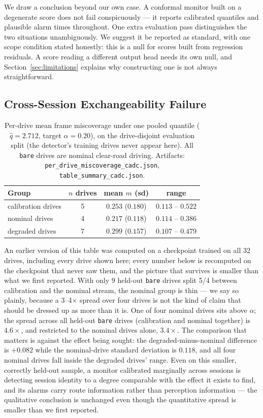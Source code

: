 We draw a conclusion beyond our own case. A conformal monitor built on a
degenerate score does not fail conspicuously --- it reports calibrated
quantiles and plausible alarm times throughout. One extra evaluation pass
distinguishes the two situations unambiguously. We suggest it be reported
as standard, with one scope condition stated honestly: this is a null for
scores built from regression residuals. A score reading a different output
head needs its own null, and Section~\ref{sec:limitations} explains why
constructing one is not always straightforward.

\subsection{Cross-Session Exchangeability Failure}
\label{sec:exchangeability}

\begin{table}[t]
\centering
\caption{Per-drive mean frame miscoverage under one pooled quantile
($\hat q = 2.712$, target $\alpha = 0.20$), on the drive-disjoint evaluation
split (the detector's training drives never appear here). All
\texttt{bare} drives are nominal clear-road driving. Artifacts:
\texttt{per\_drive\_miscoverage\_cadc.json},
\texttt{table\_summary\_cadc.json}.}
\label{tab:per-drive}
\begin{tabular}{@{}lccc@{}}
\toprule
Group & $n$ drives & mean $m$ (sd) & range \\
\midrule
calibration drives & 5 & $0.253$ ($0.180$) & $0.113$ -- $0.522$ \\
nominal drives & 4 & $0.217$ ($0.118$) & $0.114$ -- $0.386$ \\
degraded drives & 7 & $0.299$ ($0.157$) & $0.107$ -- $0.479$ \\
\bottomrule
\end{tabular}
\end{table}

An earlier version of this table was computed on a checkpoint trained on
all 32 drives, including every drive shown here; every number below is
recomputed on the checkpoint that never saw them, and the picture that
survives is smaller than what we first reported. With only 9 held-out
\texttt{bare} drives split 5/4 between calibration and the nominal stream,
the nominal group is thin --- we say so plainly, because a 3--4$\times$
spread over four drives is not the kind of claim that should be dressed up
as more than it is. One of four nominal drives sits above $\alpha$; the
spread across all held-out \texttt{bare} drives (calibration and nominal
together) is $4.6\times$, and restricted to the nominal drives alone,
$3.4\times$. The comparison that matters is against the effect being
sought: the degraded-minus-nominal difference is $+0.082$ while the
nominal-drive standard deviation is $0.118$, and all four nominal drives
fall inside the degraded drives' range. Even on this smaller, correctly
held-out sample, a monitor calibrated marginally across sessions is
detecting session identity to a degree comparable with the effect it exists
to find, and its alarms carry route information rather than perception
information --- the qualitative conclusion is unchanged even though the
quantitative spread is smaller than we first reported.


